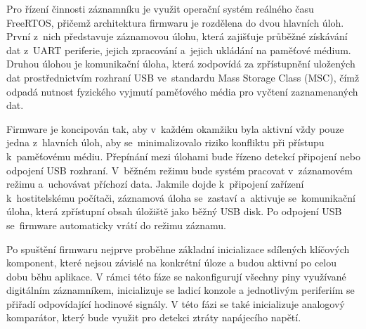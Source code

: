 Pro řízení činnosti záznamníku je využit operační systém reálného času FreeRTOS, přičemž architektura firmwaru je rozdělena do dvou hlavních úloh. První z~nich představuje záznamovou úlohu, která zajišťuje průběžné získávání dat z~UART periferie, jejich zpracování a~jejich ukládání na paměťové médium. Druhou úlohou je komunikační úloha, která zodpovídá za zpřístupnění uložených dat prostřednictvím rozhraní USB ve~standardu Mass Storage Class (MSC), čímž odpadá nutnost fyzického vyjmutí paměťového média pro vyčtení zaznamenaných dat. 



Firmware je koncipován tak, aby v~každém okamžiku byla aktivní vždy pouze jedna z~hlavních úloh, aby se~minimalizovalo riziko konfliktu při přístupu k~paměťovému médiu. Přepínání mezi úlohami bude řízeno detekcí připojení nebo odpojení USB rozhraní. V~běžném režimu bude systém pracovat v~záznamovém režimu a~uchovávat příchozí data. Jakmile dojde k~připojení zařízení k~hostitelskému počítači, záznamová úloha se~zastaví a~aktivuje se~komunikační úloha, která zpřístupní obsah úložiště jako běžný USB disk. Po odpojení USB se~firmware automaticky vrátí do režimu záznamu.

Po spuštění firmwaru nejprve proběhne základní inicializace sdílených klíčových komponent, které nejsou závislé na konkrétní úloze a budou aktivní po celou dobu běhu aplikace. V rámci této fáze se nakonfigurují všechny piny využívané digitálním záznamníkem, inicializuje se ladicí konzole a jednotlivým periferiím se přiřadí odpovídající hodinové signály. V této fázi se také inicializuje analogový komparátor, který bude využit pro detekci ztráty napájecího napětí.

